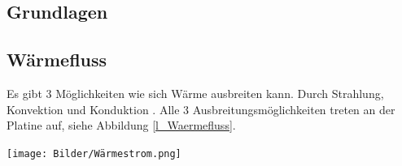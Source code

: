 \documentclass[10pt,a4paper,oneside,abstracton]{scrartcl}
\newenvironment{Figure}
  {\par\medskip\noindent\minipage{\linewidth}}
  {\endminipage\par\medskip}
\begin{document}
\begin{multicols}{2}
\section{Grundlagen}

\subsection{Wärmefluss}
Es gibt 3 Möglichkeiten 
wie sich Wärme ausbreiten kann. Durch Strahlung, Konvektion und Konduktion \cite{Waermefluss}. 
Alle 3 Ausbreitungsmöglichkeiten treten an der Platine auf, siehe Abbildung \ref*{l_Waermefluss}. 

\begin{Figure}
	\texttt{[image: Bilder/Wärmestrom.png]}
	\label{l_Waermefluss}
\end{Figure}


\end{multicols}
\end{document}
